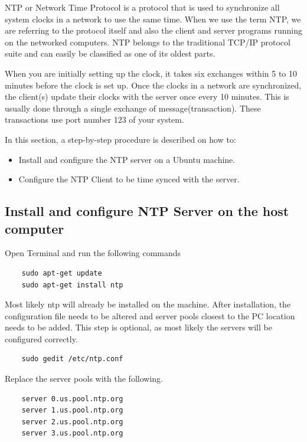 \documentclass[12]{article}
\begin{document}
NTP or Network Time Protocol is a protocol that is used to synchronize all system clocks in a network to use the same time. When we use the term NTP, we are referring to the protocol itself and also the client and server programs running on the networked computers. NTP belongs to the traditional TCP/IP protocol suite and can easily be classified as one of its oldest parts.

When you are initially setting up the clock, it takes six exchanges within 5 to 10 minutes before the clock is set up. Once the clocks in a network are synchronized, the client(s) update their clocks with the server once every 10 minutes. This is usually done through a single exchange of message(transaction). These transactions use port number 123 of your system.

In this section, a step-by-step procedure is described on how to:

\begin{itemize}
	\item{Install and configure the NTP server on a Ubuntu machine.}
	\item{Configure the NTP Client to be time synced with the server.}
\end{itemize}

\subsection{Install and configure NTP Server on the host computer} 

Open Terminal and run the following commands

\begin{lstlisting}
    sudo apt-get update
    sudo apt-get install ntp
\end{lstlisting}

Most likely ntp will already be installed on the machine. After installation, the configuration file needs to be altered and server pools closest to the PC location needs to be added. This step is optional, as most likely the servers will be configured correctly.

\begin{lstlisting}
    sudo gedit /etc/ntp.conf
\end{lstlisting}

Replace the server pools with the following.

\begin{lstlisting}
    server 0.us.pool.ntp.org
	server 1.us.pool.ntp.org
	server 2.us.pool.ntp.org
	server 3.us.pool.ntp.org
\end{lstlisting}
\end{document}
